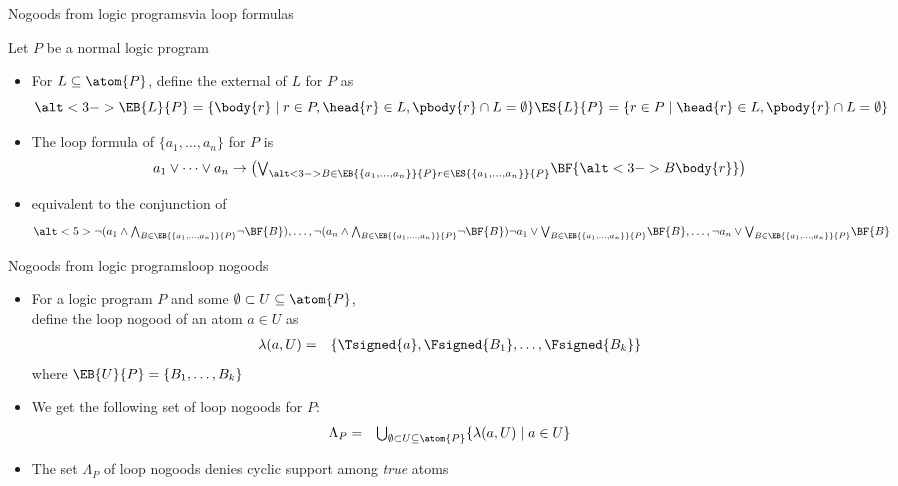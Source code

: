 \begin{frame}{Nogoods from logic programs}{via loop formulas}

  Let $P$ be a normal logic program

  \begin{itemize}
  \item <2->
    For $L\subseteq\atom{P}$,
    define the \alert{external } of $L$ for $P$ as
    \[
      \alt<3->{\EB{L}{P} = \{ \body{r}     \mid r\in P,\head{r}\in L, \pbody{r}\cap L=\emptyset \}}
              {\ES{L}{P} = \{       r \in P\mid        \head{r}\in L, \pbody{r}\cap L=\emptyset \}}
    \]
  \item<2->
    The \alert{loop formula} of $\{a_1,\dots,a_n\}$ for $P$ is
    \[
      a_1\vee\dots\vee a_n
      \rightarrow
      \big(
      \textstyle{\bigvee_{\alt<3->{B\in\EB{\{a_1,\dots,a_n\}}{P}}{r\in\ES{\{a_1,\dots,a_n\}}{P}}}}\BF{\alt<3->{B}{\body{r}}}
      \big)
    \]
  \item<4->[] equivalent to the conjunction of
    \[
      \alt<5>{%
        \neg (     a_1\wedge\textstyle{\bigwedge_{B\in\EB{\{a_1,\dots,a_n\}}{P}}}\neg\BF{B})
        ,\dots,
        \neg (     a_n\wedge\textstyle{\bigwedge_{B\in\EB{\{a_1,\dots,a_n\}}{P}}}\neg\BF{B})}{%
              \neg a_1\vee  \textstyle{\bigvee  _{B\in\EB{\{a_1,\dots,a_n\}}{P}}}\BF{B}
        ,\dots,
              \neg a_n\vee  \textstyle{\bigvee  _{B\in\EB{\{a_1,\dots,a_n\}}{P}}}\BF{B}}
    \]
  \end{itemize}
\end{frame}
\begin{frame}{Nogoods from logic programs}{loop nogoods} %
  \begin{itemize}
  \item<1->
    For a logic program $P$ and some $\emptyset \subset U\subseteq\atom{P}$,\\
    define the \alert{loop nogood} of an atom $a\in U$ as
    \begin{eqnarray*}
      \lambda(a,U)
      & = &
      \{\Tsigned{a},\Fsigned{B_1},\dots,\Fsigned{B_k}\}
    \end{eqnarray*}
    where $\EB{U}{P}=\{B_1,\dots,B_k\}$
    \medskip
  \item<2->
    We get the following set of loop nogoods for $P$:
    \begin{eqnarray*}
      \Lambda_P
      & = &
      \textstyle
      \bigcup_{\emptyset\subset U\subseteq \atom{P}}
      \{
      \lambda(a,U)
      \mid
      a\in U
      \}
    \end{eqnarray*}
  \item<3->  The set $\Lambda_P$ of loop nogoods denies cyclic
    support among \emph{true} atoms
  \end{itemize}
\end{frame}
